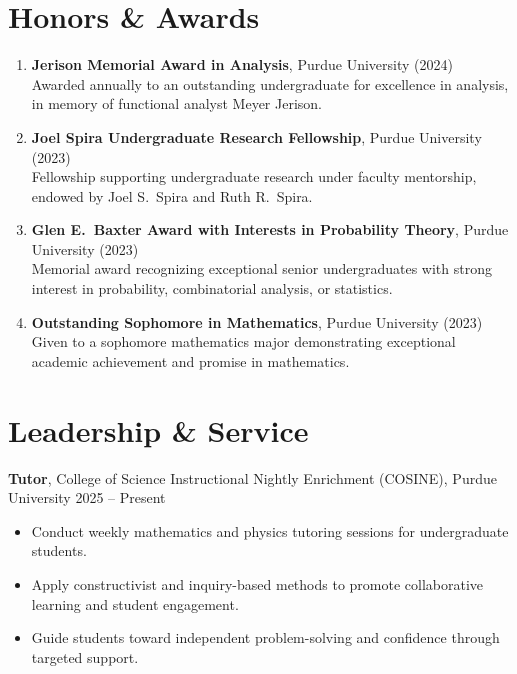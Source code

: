 \documentclass[11pt,letterpaper]{article}
\begin{document}
\section*{Honors \& Awards}
\begin{enumerate}

\item \textbf{Jerison Memorial Award in Analysis}, Purdue University (2024) \\
Awarded annually to an outstanding undergraduate for excellence in analysis, in memory of functional analyst Meyer Jerison.

\item \textbf{Joel Spira Undergraduate Research Fellowship}, Purdue University (2023) \\
Fellowship supporting undergraduate research under faculty mentorship, endowed by Joel S.\ Spira and Ruth R.\ Spira.

\item \textbf{Glen E.\ Baxter Award with Interests in Probability Theory}, Purdue University (2023) \\
Memorial award recognizing exceptional senior undergraduates with strong interest in probability, combinatorial analysis, or statistics.

\item \textbf{Outstanding Sophomore in Mathematics}, Purdue University (2023) \\
Given to a sophomore mathematics major demonstrating exceptional academic achievement and promise in mathematics.

\end{enumerate}

\section*{Leadership \& Service}

\textbf{Tutor}, College of Science Instructional Nightly Enrichment (COSINE), Purdue University \hfill 2025 -- Present
\begin{itemize}
    \item Conduct weekly mathematics and physics tutoring sessions for undergraduate students.
    \item Apply constructivist and inquiry-based methods to promote collaborative learning and student engagement.
    \item Guide students toward independent problem-solving and confidence through targeted support.
\end{itemize}
\end{document}
